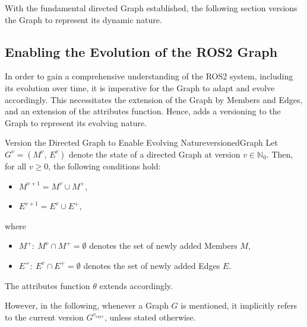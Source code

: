     With the fundamental directed Graph established, the following section versions the Graph to represent its dynamic nature.


    \subsection{Enabling the Evolution of the ROS2 Graph} \label{subsec:mathModel:versioning}
    In order to gain a comprehensive understanding of the ROS2 system, including its evolution over time, it is imperative for the Graph to adapt and evolve accordingly. This necessitates the extension of the Graph by Members and Edges, and an extension of the attributes function. \newline
    Hence,  adds a versioning to the Graph to represent its evolving nature.
    \begin{definitionbox}{Version the Directed Graph to Enable Evolving Nature}{versionedGraph}
        Let $G^v = (M^v,\,E^v)$ denote the state of a directed Graph at version $v \in \mathbb{N}_0$.
        Then, for all $v \geq 0$, the following conditions hold:
        \begin{itemize}[label=$\circ$]
            \item $M^{v+1} = M^v \cup M^+$,
            \item $E^{v+1} = E^v \cup E^+$,
        \end{itemize}
        where
        \begin{itemize}[label=$\circ$]
            \item $M^+\colon\: M^v \cap M^+ = \emptyset$ denotes the set of newly added Members $M$,
            \item $E^+\colon\: E^v \cap E^+ = \emptyset$ denotes the set of newly added Edges $E$.
        \end{itemize}
        \medskip
        The attributes function $\theta$ extends accordingly.
    \end{definitionbox}
    However, in the following, whenever a Graph $G$ is mentioned, it implicitly refers to the current version $G^{v_{curr}}$, unless stated otherwise.


